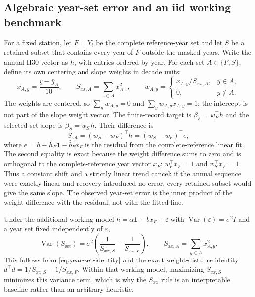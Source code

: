 \subsection{Algebraic year-set error and an iid working benchmark}

For a fixed station, let $F=Y_i$ be the complete reference-year set and let $S$ be a retained subset that contains every year of $F$ outside the masked years. Write the annual H30 vector as $h$, with entries ordered by year. For each set $A\in\{F,S\}$, define its own centering and slope weights in decade units:
\begin{equation}
 x_{A,y}=\frac{y-\bar y_A}{10},\qquad
 S_{xx,A}=\sum_{z\in A}x_{A,z}^{2},\qquad
 w_{A,y}=
 \begin{cases}
 x_{A,y}/S_{xx,A}, & y\in A,\\
 0, & y\notin A.
 \end{cases}
 \label{eq:subset-weights}
\end{equation}
The weights are centered, so $\sum_y w_{A,y}=0$ and $\sum_y w_{A,y}x_{A,y}=1$; the intercept is not part of the slope weight vector. The finite-record target is $\beta_F=w_F^\top h$ and the selected-set slope is $\beta_S=w_S^\top h$. Their difference is
\begin{equation}
 S_{\mathrm{set}}=(w_S-w_F)^\top h=(w_S-w_F)^\top e,
 \label{eq:year-set-identity}
\end{equation}
where $e=h-\bar h_F\mathbf{1}-\hat b_F x_F$ is the residual from the complete-reference linear fit. The second equality is exact because the weight difference sums to zero and is orthogonal to the complete-reference year vector $x_F$: $w_F^\top x_F=1$ and $w_S^\top x_F=1$. Thus a constant shift and a strictly linear trend cancel: if the annual sequence were exactly linear and recovery introduced no error, every retained subset would give the same slope. The observed year-set error is the inner product of the weight difference with the residual, not with the fitted line.

Under the additional working model $h=\alpha\mathbf{1}+b x_F+\varepsilon$ with $\operatorname{Var}(\varepsilon)=\sigma^2 I$ and a year set fixed independently of $\varepsilon$,
\begin{equation}
 \operatorname{Var}(S_{\mathrm{set}})
 =\sigma^2\left(\frac{1}{S_{xx,S}}-\frac{1}{S_{xx,F}}\right),
 \qquad S_{xx,A}=\sum_{y\in A}x_{A,y}^2 .
 \label{eq:year-set-variance}
\end{equation}
This follows from \eqref{eq:year-set-identity} and the exact weight-distance identity $d^\top d=1/S_{xx,S}-1/S_{xx,F}$. Within that working model, maximizing $S_{xx,S}$ minimizes this variance term, which is why the $S_{xx}$ rule is an interpretable baseline rather than an arbitrary heuristic.

